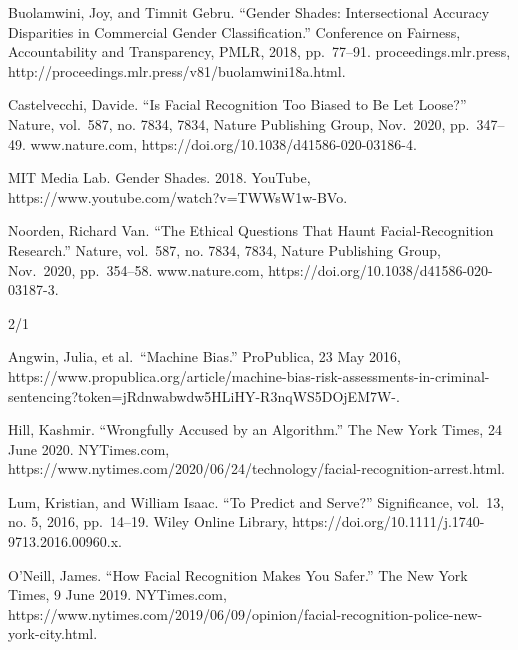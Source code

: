 \documentclass[
]{article}
\newlength{\cslhangindent}
\newlength{\cslentryspacingunit} %
\newenvironment{CSLReferences}[2] %
 {%
  \setlength{\parindent}{0pt}
  \ifodd #1
  \let\oldpar\par
  \def\par{\hangindent=\cslhangindent\oldpar}
  \fi
  \setlength{\parskip}{#2\cslentryspacingunit}
 }%
 {}
\begin{document}
\begin{CSLReferences}{0}{0}
Buolamwini, Joy, and Timnit Gebru. ``Gender Shades: Intersectional
Accuracy Disparities in Commercial Gender Classification.'' Conference
on Fairness, Accountability and Transparency, PMLR, 2018, pp.~77--91.
proceedings.mlr.press,
http://proceedings.mlr.press/v81/buolamwini18a.html.

{}

Castelvecchi, Davide. ``Is Facial Recognition Too Biased to Be Let
Loose?'' Nature, vol.~587, no. 7834, 7834, Nature Publishing Group,
Nov.~2020, pp.~347--49. www.nature.com,
https://doi.org/10.1038/d41586-020-03186-4.

{}

MIT Media Lab. Gender Shades. 2018. YouTube,
https://www.youtube.com/watch?v=TWWsW1w-BVo.

{}

Noorden, Richard Van. ``The Ethical Questions That Haunt
Facial-Recognition Research.'' Nature, vol.~587, no. 7834, 7834, Nature
Publishing Group, Nov.~2020, pp.~354--58. www.nature.com,
https://doi.org/10.1038/d41586-020-03187-3.

{}

\end{CSLReferences}

2/1

\begin{CSLReferences}{0}{0}
Angwin, Julia, et al.~``Machine Bias.'' ProPublica, 23 May 2016,
https://www.propublica.org/article/machine-bias-risk-assessments-in-criminal-sentencing?token=jRdnwabwdw5HLiHY-R3nqWS5DOjEM7W-.

{}

Hill, Kashmir. ``Wrongfully Accused by an Algorithm.'' The New York
Times, 24 June 2020. NYTimes.com,
https://www.nytimes.com/2020/06/24/technology/facial-recognition-arrest.html.

{}

Lum, Kristian, and William Isaac. ``To Predict and Serve?''
Significance, vol.~13, no. 5, 2016, pp.~14--19. Wiley Online Library,
https://doi.org/10.1111/j.1740-9713.2016.00960.x.

{}

O'Neill, James. ``How Facial Recognition Makes You Safer.'' The New York
Times, 9 June 2019. NYTimes.com,
https://www.nytimes.com/2019/06/09/opinion/facial-recognition-police-new-york-city.html.

{}

\end{CSLReferences}
\end{document}
